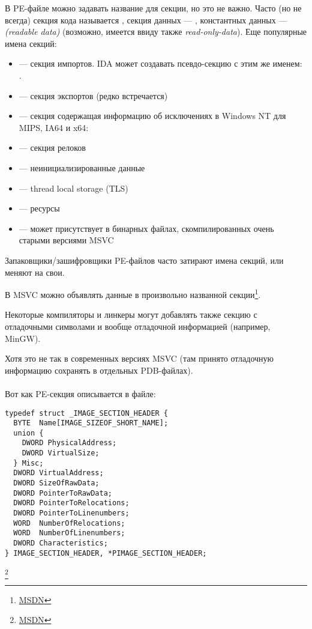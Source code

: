 В PE-файле можно задавать название для секции, но это не важно.
Часто (но не всегда) секция кода называется , секция данных --- , константных данных ---  \emph{(readable data)} (возможно, имеется ввиду также \emph{read-only-data}).
Еще популярные имена секций: 

\begin{itemize}
\item {} --- секция импортов. \ac{IDA} может создавать псевдо-секцию с этим же именем: .
\item {} --- секция экспортов (редко встречается)
\item {} --- секция содержащая информацию об исключениях в Windows NT для MIPS, \ac{IA64} и x64: 
\item {} --- секция релоков
\item {} --- неинициализированные данные
\item {} --- thread local storage (\ac{TLS})
\item {} --- ресурсы
\item {} --- может присутствует в бинарных файлах, скомпилированных очень старыми версиями MSVC
\end{itemize}

Запаковщики/зашифровщики PE-файлов часто затирают имена секций, или меняют на свои.

В \ac{MSVC} можно объявлять данные в произвольно названной секции\footnote{\href{http://go.yurichev.com/17047}{MSDN}}.

Некоторые компиляторы и линкеры могут добавлять также секцию с отладочными символами 
и вообще отладочной информацией (например, MinGW).

Хотя это не так в современных версиях \ac{MSVC} (там принято отладочную информацию сохранять в отдельных \gls{PDB}-файлах).\\
\\
Вот как PE-секция описывается в файле:

\begin{lstlisting}[style=customc]
typedef struct _IMAGE_SECTION_HEADER {
  BYTE  Name[IMAGE_SIZEOF_SHORT_NAME];
  union {
    DWORD PhysicalAddress;
    DWORD VirtualSize;
  } Misc;
  DWORD VirtualAddress;
  DWORD SizeOfRawData;
  DWORD PointerToRawData;
  DWORD PointerToRelocations;
  DWORD PointerToLinenumbers;
  WORD  NumberOfRelocations;
  WORD  NumberOfLinenumbers;
  DWORD Characteristics;
} IMAGE_SECTION_HEADER, *PIMAGE_SECTION_HEADER;
\end{lstlisting}
\footnote{\href{http://go.yurichev.com/17048}{MSDN}}

